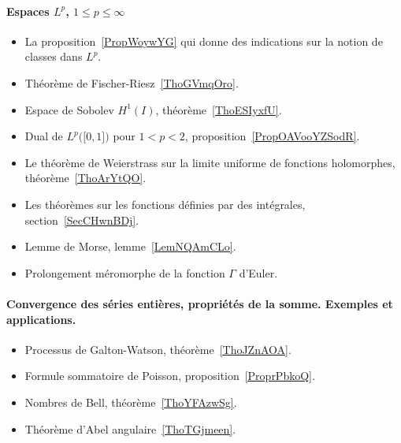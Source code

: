 \paragraph{Espaces \( L^p\), \( 1\leq p\leq\infty\)}
\begin{itemize}
    \item La proposition~\ref{PropWoywYG} qui donne des indications sur la notion de classes dans \( L^p\).
    \item Théorème de Fischer-Riesz~\ref{ThoGVmqOro}.
    \item Espace de Sobolev \( H^1(I)\), théorème~\ref{ThoESIyxfU}.
    \item Dual de \( L^p\big( \mathopen[ 0 , 1 \mathclose] \big)\) pour \( 1<p<2\), proposition~\ref{PropOAVooYZSodR}.
\end{itemize}
\begin{itemize}
    \item Le théorème de Weierstrass sur la limite uniforme de fonctions holomorphes, théorème~\ref{ThoArYtQO}.
    \item Les théorèmes sur les fonctions définies par des intégrales, section~\ref{SecCHwnBDj}.
    \item Lemme de Morse, lemme~\ref{LemNQAmCLo}.
    \item Prolongement méromorphe de la fonction \( \Gamma\) d'Euler.
\end{itemize}
\paragraph{Convergence des séries entières, propriétés de la somme. Exemples et applications.}
\begin{itemize}
    \item Processus de Galton-Watson, théorème~\ref{ThoJZnAOA}.
    \item Formule sommatoire de Poisson, proposition~\ref{ProprPbkoQ}.
    \item Nombres de Bell, théorème~\ref{ThoYFAzwSg}.
    \item Théorème d'Abel angulaire~\ref{ThoTGjmeen}.
\end{itemize}
